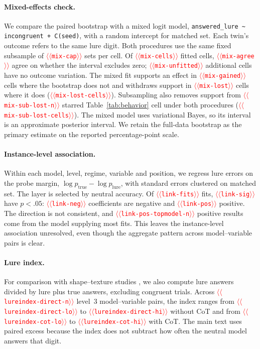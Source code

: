 \documentclass[11pt]{article}
\providecommand{\NUM}[1]{\textcolor{red}{$\langle\langle$\texttt{#1}$\rangle\rangle$}}
\begin{document}
\paragraph{Mixed-effects check.} We compare the paired bootstrap with a mixed logit model,
\texttt{answered\_lure \textasciitilde{} incongruent + C(seed)}, with a random intercept for
matched set. Each twin's outcome refers to the same lure digit. Both procedures use the same
fixed subsample of \NUM{mix-cap} sets per cell. Of \NUM{mix-cells} fitted cells,
\NUM{mix-agree} agree on whether the interval excludes zero; \NUM{mix-unfitted} additional
cells have no outcome variation. The mixed fit supports an effect in \NUM{mix-gained} cells
where the bootstrap does not and withdraws support in \NUM{mix-lost} cells where it does
(\NUM{mix-lost-cells}). Subsampling also removes support from \NUM{mix-sub-lost-n} starred
Table~\ref{tab:behavior} cell under both procedures (\NUM{mix-sub-lost-cells}). The mixed
model uses variational Bayes, so its interval is an approximate posterior interval. We retain
the full-data bootstrap as the primary estimate on the reported percentage-point scale.

\paragraph{Instance-level association.} Within each model, level, regime, variable and
position, we regress lure errors on the probe margin, $\log p_{\mathrm{true}}-\log p_{\mathrm{lure}}$,
with standard errors clustered on matched set. The layer is selected by neutral accuracy.
Of \NUM{link-fits} fits, \NUM{link-sig} have $p<.05$: \NUM{link-neg} coefficients are negative
and \NUM{link-pos} positive. The direction is not consistent, and \NUM{link-pos-topmodel-n}
positive results come from the model supplying most fits. This leaves the instance-level
association unresolved, even though the aggregate pattern across model--variable pairs is clear.

\paragraph{Lure index.} For comparison with shape--texture studies \cite{geirhos2019texture},
we also compute lure answers divided by lure plus true answers, excluding congruent trials.
Across \NUM{lureindex-direct-n} level~3 model--variable pairs, the index ranges from
\NUM{lureindex-direct-lo} to \NUM{lureindex-direct-hi} without CoT and from
\NUM{lureindex-cot-lo} to \NUM{lureindex-cot-hi} with CoT. The main text uses paired excess
because the index does not subtract how often the neutral model answers that digit.
\end{document}
